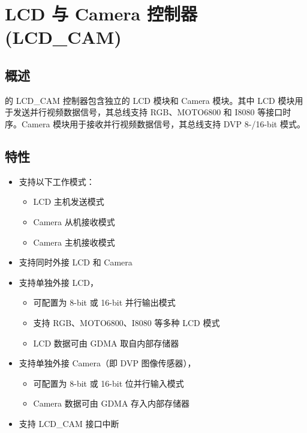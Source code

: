 \documentclass[main\_\_CN.tex]{subfiles}
\begin{document}

\ifglobal
\else
    {\let\clearpage\relax \listoftodos}
    \tableofcontents
\fi



\hypertarget{camlcdctrl}{}
\chapter{LCD 与 Camera 控制器 (LCD\_CAM)}
\label{mod:camlcdctrl}



\section{概述}

\chipname{} 的 LCD\_CAM 控制器包含独立的 LCD 模块和 Camera 模块。其中 LCD 模块用于发送并行视频数据信号，其总线支持 RGB、MOTO6800 和 I8080 等接口时序。Camera 模块用于接收并行视频数据信号，其总线支持 DVP 8-/16-bit 模式。

\section{特性}
\begin{itemize}
    \item 支持以下工作模式：
    \begin{itemize}
        \item LCD 主机发送模式
        \item Camera 从机接收模式
        \item Camera 主机接收模式
    \end{itemize}
    \item 支持同时外接 LCD 和 Camera
    \item 支持单独外接 LCD，

    \begin{itemize}
        \item 可配置为 8-bit 或 16-bit 并行输出模式
        \item 支持 RGB、MOTO6800、I8080 等多种 LCD 模式
        \item LCD 数据可由 GDMA 取自内部存储器
    \end{itemize}
    \item 支持单独外接 Camera（即 DVP 图像传感器），
    \begin{itemize}
    \item 可配置为 8-bit 或 16-bit 位并行输入模式

        \item Camera 数据可由 GDMA 存入内部存储器
    \end{itemize}


    \item 支持 LCD\_CAM 接口中断
\end{itemize}
\end{document}
